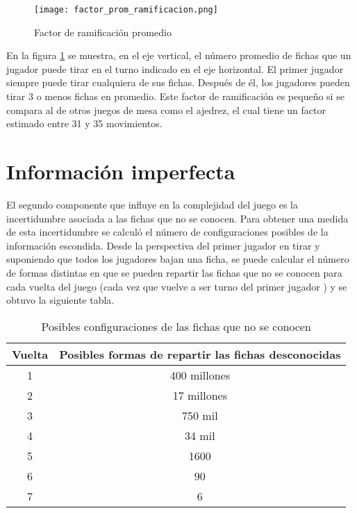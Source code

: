 \begin{figure}[ht]
\begin{center}
\texttt{[image: factor\_prom\_ramificacion.png]}
\caption{Factor de ramificación promedio}
\label{FPR}
\end{center}
\end{figure}

En la figura \ref{FPR} se muestra, en el eje vertical, el número promedio de fichas que un jugador 
puede tirar en el turno indicado en el eje horizontal. El primer jugador siempre puede tirar 
cualquiera de sus fichas. Después de él, los jugadores pueden tirar 3 o menos fichas en 
promedio. Este factor de ramificación es pequeño si se compara al de otros juegos de mesa 
como el ajedrez, el cual tiene un factor estimado entre 31 y 35 movimientos.

\section{Información imperfecta}

El segundo componente que influye en la complejidad del juego es la incertidumbre 
asociada a las fichas que no se conocen. Para obtener una medida de esta incertidumbre se 
calculó el número de configuraciones posibles de la información escondida. Desde la 
perspectiva del primer jugador en tirar y suponiendo que todos los jugadores bajan una 
ficha, se puede calcular el número de formas distintas en que se pueden repartir las fichas 
que no se conocen para cada vuelta del juego (cada vez que vuelve a ser turno del primer 
jugador ) y se obtuvo la siguiente tabla.

\begin{table}[H]
\centering
\caption{Posibles configuraciones de las fichas que no se conocen}
\label{PC}
\begin{tabular}{|c|c|}
\hline
 Vuelta & Posibles formas de repartir las fichas desconocidas\\ 
\hline
1 & 400 millones \\
2 & 17 millones \\
3 & 750 mil \\
4 & 34 mil \\
5 & 1600 \\
6 & 90 \\
7 & 6 \\
\hline
\end{tabular}


\end{table}

